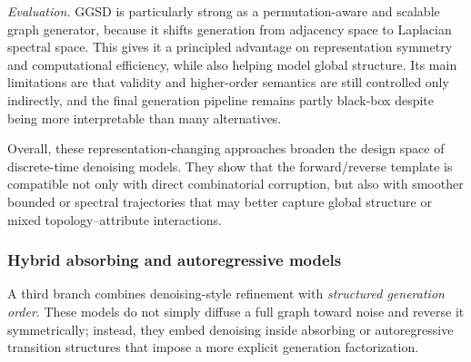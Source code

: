 \documentclass{article}
\begin{document}
\emph{Evaluation.} GGSD is particularly strong as a permutation-aware and scalable graph generator, because it shifts generation from adjacency space to Laplacian spectral space. This gives it a principled advantage on representation symmetry and computational efficiency, while also helping model global structure. Its main limitations are that validity and higher-order semantics are still controlled only indirectly, and the final generation pipeline remains partly black-box despite being more interpretable than many alternatives.


Overall, these representation-changing approaches broaden the design space of discrete-time denoising models. They show that the forward/reverse template is compatible not only with direct combinatorial corruption, but also with smoother bounded or spectral trajectories that may better capture global structure or mixed topology--attribute interactions.

\subsubsection{Hybrid absorbing and autoregressive models}
\label{sec:hybrid_absorbing_autoregressive_diffusion}



A third branch combines denoising-style refinement with \emph{structured generation order}. These models do not simply diffuse a full graph toward noise and reverse it symmetrically; instead, they embed denoising inside absorbing or autoregressive transition structures that impose a more explicit generation factorization.
\end{document}
